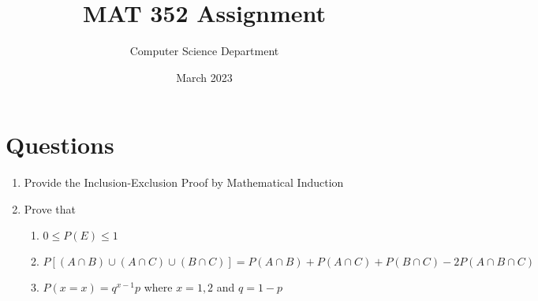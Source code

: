 \documentclass{article}
\title{MAT 352 Assignment}
\author{Computer Science Department}
\date{March 2023}
\begin{document}
\maketitle

\section{Questions}

\begin{enumerate}
    \item Provide the Inclusion-Exclusion Proof by Mathematical Induction
    \item Prove that
        \begin{enumerate}[label=(\alph*)]
            \item $0 \leq P(E) \leq 1$
            \item $P[(A \cap B) \cup (A \cap C) \cup (B \cap C)] = P(A \cap B) + P(A \cap C) + P(B \cap C) - 2P(A \cap B \cap C)$
            \item $P(x=x) = q^{x-1}p$ where $x=1,2$ and $q = 1-p$
        \end{enumerate}
\end{enumerate}
\end{document}
